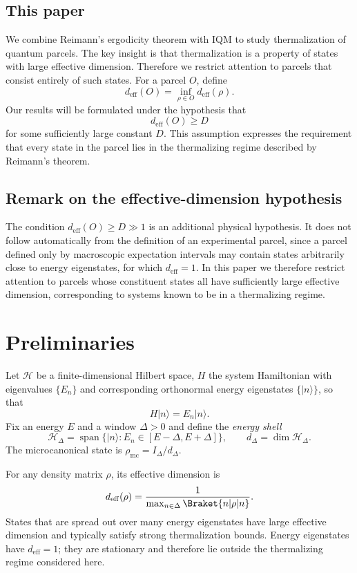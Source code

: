 \documentclass[11pt, onecolumn]{article}
\begin{document}
\subsection{This paper}

We combine Reimann's ergodicity theorem with IQM to study thermalization of quantum parcels. The key insight is that thermalization is a property of states with large effective dimension. Therefore we restrict attention to parcels that consist entirely of such states. For a parcel \(O\), define
\[
d_{\mathrm{eff}}(O) = \inf_{\rho\in O} d_{\mathrm{eff}}(\rho).
\]
Our results will be formulated under the hypothesis that
\[
d_{\mathrm{eff}}(O)\ge D
\]
for some sufficiently large constant \(D\). This assumption expresses
the requirement that every state in the parcel lies in the thermalizing
regime described by Reimann's theorem.
\subsection{Remark on the effective-dimension hypothesis}

The condition \(d_{\mathrm{eff}}(O)\ge D\gg1\) is an additional physical
hypothesis. It does not follow automatically from the definition of an
experimental parcel, since a parcel defined only by macroscopic
expectation intervals may contain states arbitrarily close to energy
eigenstates, for which \(d_{\mathrm{eff}}=1\). In this paper we
therefore restrict attention to parcels whose constituent states all
have sufficiently large effective dimension, corresponding to systems
known to be in a thermalizing regime.

\section{Preliminaries}

Let \(\mathcal H\) be a finite-dimensional Hilbert space,
\(H\) the system Hamiltonian with eigenvalues
\(\{E_n\}\) and corresponding orthonormal energy eigenstates
\(\{|n\rangle\}\), so that
\[
H|n\rangle = E_n |n\rangle .
\] Fix an energy \(E\) and a window \(\Delta>0\) and define the \emph{energy shell}
\[
\mathcal{H}_{\Delta} = \operatorname{span}\bigl\{|n\rangle : E_n\in[E-\Delta, E+\Delta]\bigr\},\qquad d_{\Delta} = \dim\mathcal{H}_{\Delta}.
\]
The microcanonical state is \(\rho_{\mathrm{mc}} = I_{\Delta} / d_{\Delta}\).

For any density matrix \(\rho\), its effective dimension is
\[
d_{\mathrm{eff}}(\rho) = \frac{1}{\max_{n\in\Delta} \Braket{n|\rho|n}}.
\]
States that are spread out over many energy eigenstates have large
effective dimension and typically satisfy strong thermalization bounds.
Energy eigenstates have \(d_{\mathrm{eff}}=1\); they are stationary and
therefore lie outside the thermalizing regime considered here.
\end{document}
